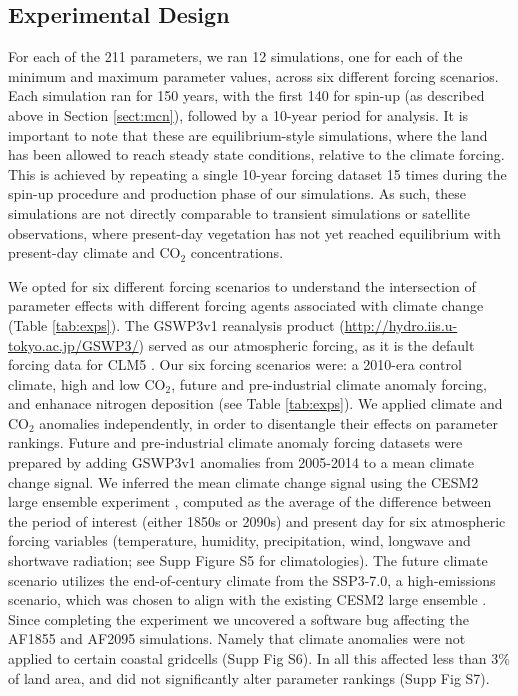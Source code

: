 \documentclass[draft]{agujournal2019}
\begin{document}
\subsection{Experimental Design}
\label{sect:exp}
For each of the 211 parameters, we ran 12 simulations, one for each of the minimum and maximum parameter values, across six different forcing scenarios. Each simulation ran for 150 years, with the first 140 for spin-up (as described above in Section \ref{sect:mcn}), followed by a 10-year period for analysis. It is important to note that these are equilibrium-style simulations, where the land has been allowed to reach steady state conditions, relative to the climate forcing. This is achieved by repeating a single 10-year forcing dataset 15 times during the spin-up procedure and production phase of our simulations. As such, these simulations are not directly comparable to transient simulations or satellite observations, where present-day vegetation has not yet reached equilibrium with present-day climate and CO$_2$ concentrations.

 We opted for six different forcing scenarios to understand the intersection of parameter effects with different forcing agents associated with climate change (Table \ref{tab:exps}). The GSWP3v1 reanalysis product (\url{http://hydro.iis.u-tokyo.ac.jp/GSWP3/}) served as our atmospheric forcing, as it is the default forcing data for CLM5 \cite{lawrence2019}. Our six forcing scenarios were: a 2010-era control climate, high and low CO$_2$, future and pre-industrial climate anomaly forcing, and enhanace nitrogen deposition (see Table \ref{tab:exps}).  We applied climate and CO$_2$ anomalies independently, in order to disentangle their effects on parameter rankings. Future and pre-industrial climate anomaly forcing datasets were prepared by adding GSWP3v1 anomalies from 2005-2014 to a mean climate change signal. We inferred the mean climate change signal using the CESM2 large ensemble experiment \cite{rodgers2021}, computed as the average of the difference between the period of interest (either 1850s or 2090s) and present day for six atmospheric forcing variables (temperature, humidity, precipitation, wind, longwave and shortwave radiation; see Supp Figure S5 for climatologies). The future climate scenario utilizes the end-of-century climate from the SSP3-7.0, a high-emissions scenario, which was chosen to align with the existing CESM2 large ensemble \cite{rodgers2021}. Since completing the experiment we uncovered a software bug affecting the AF1855 and AF2095 simulations. Namely that climate anomalies were not applied to certain coastal gridcells (Supp Fig S6). In all this affected less than 3\% of land area, and did not significantly alter parameter rankings (Supp Fig S7).  
\end{document}
